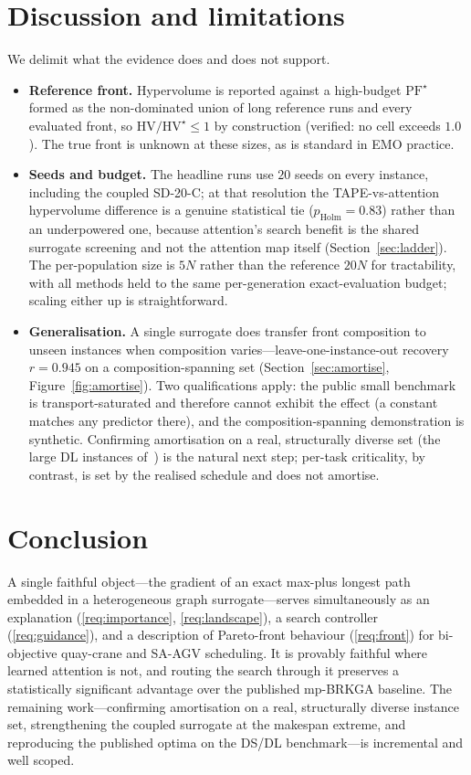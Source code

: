 \documentclass[11pt]{article}
\begin{document}
\section{Discussion and limitations}
\label{sec:limits}
We delimit what the evidence does and does not support.
\begin{itemize}[leftmargin=*]
  \item \textbf{Reference front.} Hypervolume is reported against a high-budget
  $\mathrm{PF}^\star$ formed as the non-dominated union of long reference runs and every
  evaluated front, so $\mathrm{HV}/\mathrm{HV}^\star \le 1$ by construction (verified: no cell
  exceeds $1.0$). The true front is unknown at these sizes, as is standard in EMO practice.
  \item \textbf{Seeds and budget.} The headline runs use $20$ seeds on every instance,
  including the coupled \textsf{SD-20-C}; at that resolution the TAPE-vs-attention hypervolume
  difference is a genuine statistical tie ($p_{\mathrm{Holm}}=0.83$) rather than an
  underpowered one, because attention's search benefit is the shared surrogate screening and
  not the attention map itself (Section~\ref{sec:ladder}). The per-population size is $5N$
  rather than the reference $20N$ for tractability, with all methods held to the same
  per-generation exact-evaluation budget; scaling either up is straightforward.
  \item \textbf{Generalisation.} A single surrogate does transfer front composition to
  unseen instances when composition varies---leave-one-instance-out recovery $r=0.945$ on a
  composition-spanning set (Section~\ref{sec:amortise}, Figure~\ref{fig:amortise}). Two
  qualifications apply: the public small benchmark is transport-saturated and therefore cannot
  exhibit the effect (a constant matches any predictor there), and the composition-spanning
  demonstration is synthetic. Confirming amortisation on a real, structurally diverse set
  (the large \textsf{DL} instances of~\cite{homayouni2022book}) is the natural next step;
  per-task criticality, by contrast, is set by the realised schedule and does not amortise.
\end{itemize}

\section{Conclusion}
A single faithful object---the gradient of an exact max-plus longest path embedded in a
heterogeneous graph surrogate---serves simultaneously as an explanation
(\ref{req:importance}, \ref{req:landscape}), a search controller (\ref{req:guidance}), and
a description of Pareto-front behaviour (\ref{req:front}) for bi-objective quay-crane and
SA-AGV scheduling. It is provably faithful where learned attention is not, and routing the
search through it preserves a statistically significant advantage over the published
mp-BRKGA baseline. The remaining work---confirming amortisation on a real, structurally
diverse instance set, strengthening the coupled surrogate at the makespan extreme, and
reproducing the published optima on the \textsf{DS}/\textsf{DL} benchmark---is incremental
and well scoped.
\end{document}
